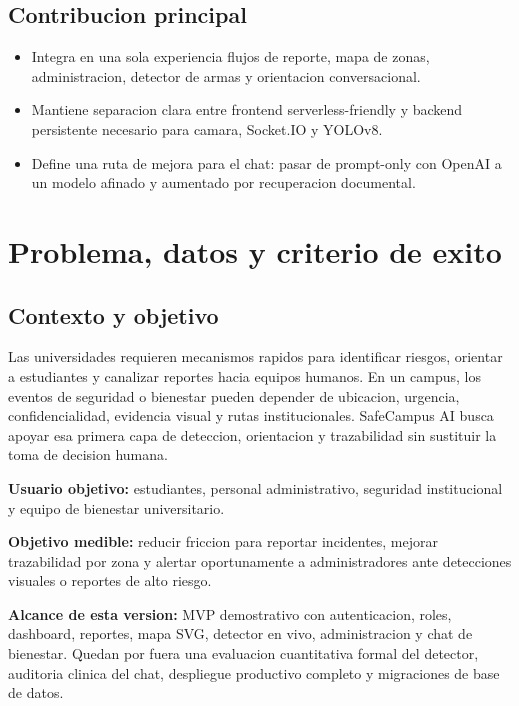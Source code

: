 \documentclass[11pt,letterpaper]{article}
\begin{document}
\subsection*{Contribucion principal}
\begin{itemize}[leftmargin=1.4em]
    \item Integra en una sola experiencia flujos de reporte, mapa de zonas, administracion, detector de armas y orientacion conversacional.
    \item Mantiene separacion clara entre frontend serverless-friendly y backend persistente necesario para camara, Socket.IO y YOLOv8.
    \item Define una ruta de mejora para el chat: pasar de prompt-only con OpenAI a un modelo afinado y aumentado por recuperacion documental.
\end{itemize}

\section{Problema, datos y criterio de exito}

\subsection{Contexto y objetivo}

Las universidades requieren mecanismos rapidos para identificar riesgos, orientar a estudiantes y canalizar reportes hacia equipos humanos. En un campus, los eventos de seguridad o bienestar pueden depender de ubicacion, urgencia, confidencialidad, evidencia visual y rutas institucionales. SafeCampus AI busca apoyar esa primera capa de deteccion, orientacion y trazabilidad sin sustituir la toma de decision humana.

\textbf{Usuario objetivo:} estudiantes, personal administrativo, seguridad institucional y equipo de bienestar universitario.

\textbf{Objetivo medible:} reducir friccion para reportar incidentes, mejorar trazabilidad por zona y alertar oportunamente a administradores ante detecciones visuales o reportes de alto riesgo.

\textbf{Alcance de esta version:} MVP demostrativo con autenticacion, roles, dashboard, reportes, mapa SVG, detector en vivo, administracion y chat de bienestar. Quedan por fuera una evaluacion cuantitativa formal del detector, auditoria clinica del chat, despliegue productivo completo y migraciones de base de datos.
\end{document}
